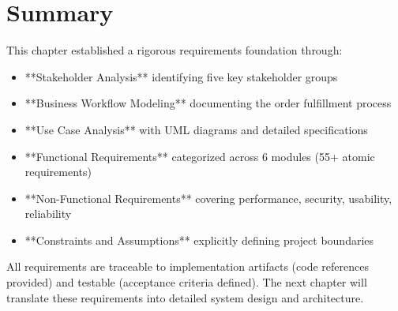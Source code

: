 \section{Summary}

This chapter established a rigorous requirements foundation through:

\begin{itemize}
    \item **Stakeholder Analysis** identifying five key stakeholder groups
    \item **Business Workflow Modeling** documenting the order fulfillment process
    \item **Use Case Analysis** with UML diagrams and detailed specifications
    \item **Functional Requirements** categorized across 6 modules (55+ atomic requirements)
    \item **Non-Functional Requirements** covering performance, security, usability, reliability
    \item **Constraints and Assumptions** explicitly defining project boundaries
\end{itemize}

All requirements are traceable to implementation artifacts (code references provided) and testable (acceptance criteria defined). The next chapter will translate these requirements into detailed system design and architecture.

